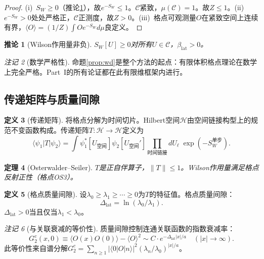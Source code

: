 \documentclass[12pt,a4paper]{article}
\theoremstyle{plain}
\newtheorem{theorem}{定理}[section]
\newtheorem{corollary}[theorem]{推论}
\theoremstyle{definition}
\newtheorem{definition}[theorem]{定义}
\theoremstyle{remark}
\newtheorem{remark}[theorem]{注记}
\begin{document}
\begin{proof}
(i)~$S_W\geq 0$（推论\ref{cor:SWnonneg}），故$e^{-S_W}\leq 1$。$\mathcal{C}$紧致，$\mu(\mathcal{C})=1$。故$Z\leq 1$。(ii)~$e^{-S_W}>0$处处严格正，$\mathcal{C}$正测度，故$Z>0$。(iii)~格点可观测量$O$在紧致空间上连续有界，$\langle O\rangle=(1/Z)\int Oe^{-S_W}d\mu$良定义。
\end{proof}

\begin{corollary}[Wilson作用量非负]\label{cor:SWnonneg}
$S_W[U]\geq 0$对所有$U\in\mathcal{C}$，$\beta_{\mathrm{lat}}>0$。
\end{corollary}

\begin{remark}[数学严格性]
命题\ref{prop:wd}是整个方法的起点：有限体积格点理论在数学上完全严格。Part~I的所有论证都在此有限维框架内进行。
\end{remark}

\subsection{传递矩阵与质量间隙}\label{sec:transfer}

\begin{definition}[传递矩阵]\label{def:transfer}
将格点分解为时间切片。Hilbert空间$\mathcal{H}$由空间链接构型上的规范不变函数构成。传递矩阵$T:\mathcal{H}\to\mathcal{H}$定义为
\begin{equation}
\langle\psi_1|T|\psi_2\rangle = \int \psi_1^*[U_{\text{空间}}]\psi_2[U_{\text{空间}}']\prod_{\text{时间链接}}dU_\ell\;\exp(-S_W^{\text{单步}}).
\end{equation}
\end{definition}

\begin{theorem}[Osterwalder--Seiler\cite{OsterwalderSeiler1978}]\label{thm:OS}
$T$是正自伴算子，$\|T\|\leq 1$。Wilson作用量满足格点反射正性（格点OS3）。
\end{theorem}

\begin{definition}[格点质量间隙]\label{def:gap}
设$\lambda_0\geq\lambda_1\geq\cdots\geq 0$为$T$的特征值。格点质量间隙：
\begin{equation}\label{eq:gapdef}
\Delta_{\mathrm{lat}} = \ln(\lambda_0/\lambda_1).
\end{equation}
$\Delta_{\mathrm{lat}}>0$当且仅当$\lambda_1<\lambda_0$。
\end{definition}

\begin{remark}[与关联衰减的等价性]
质量间隙控制连通关联函数的指数衰减率：
\begin{equation}\label{eq:expdecay}
G_2^c(x,0) \equiv \langle O(x)O(0)\rangle - \langle O\rangle^2 \sim C\cdot e^{-\Delta_{\mathrm{lat}}|x|/a} \quad (|x|\to\infty).
\end{equation}
此等价性来自谱分解$G_2^c=\sum_{n\geq 1}|\langle 0|O|n\rangle|^2(\lambda_n/\lambda_0)^{|x|/a}$。
\end{remark}
\end{document}
